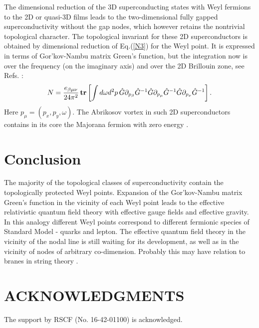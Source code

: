 \documentclass[prb,
superscriptaddress,showpacs,amsmath,amssymb]{revtex4}
\begin{document}
The  dimensional reduction of the 3D superconducting states with Weyl fermions to the 2D or quasi-3D 
films leads to the two-dimensional fully gapped superconductivity without the gap nodes, which however retains the nontrivial topological character. The topological invariant for these 2D superconductors is obtained by dimensional reduction of Eq.(\ref{N3}) for the Weyl point. It is expressed in terms of Gor'kov-Nambu matrix Green's function, but the integration now is over the frequency (on the imaginary axis) and over the 2D Brillouin zone,
see Refs. \cite{So1985,IshikawaMatsuyama1986,IshikawaMatsuyama1987,Volovik1988b}:
\begin{equation}
N= \frac{e_{\beta\mu\nu}}{24\pi^2} \,
{\bf tr}\left[ \int d\omega d^2p\,
 \hat G\partial_{p_\beta}  \hat G^{-1}
 \hat G\partial_{p_\mu}  \hat G^{-1}  \hat G\partial_{p_\nu}   \hat G^{-1}\right].
\label{2D}
\end{equation}
Here $p_\mu=(p_x,p_y,\omega)$.
The  Abrikosov vortex in such 2D superconductors contains in its core the Majorana fermion with zero energy \cite{Volovik1999,ReadGreen2000,Ivanov2001}.




  \section{Conclusion}

 The majority of the topological classes of superconductivity contain the topologically protected Weyl points.
Expansion of the Gor'kov-Nambu matrix Green's function in the vicinity of each Weyl point leads to the effective relativistic quantum field theory with effective gauge fields and effective gravity. In this analogy different Weyl points correspond to different fermionic species of Standard Model - quarks and lepton.  The effective quantum field theory in the vicinity of the nodal line
is still waiting for its development, as well as in the vicinity of nodes of arbitrary co-dimension. Probably this may have relation to branes in string theory \cite{Horava2005}.


\section*{\hspace*{-4.5mm}ACKNOWLEDGMENTS}
 The support by RSCF (No. 16-42-01100) is acknowledged.
 

 
\end{document}
